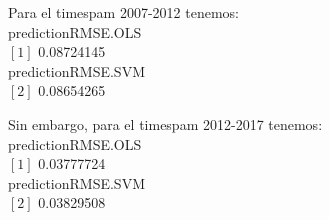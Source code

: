 			\vspace{4mm}	
			
			Para el timespam 2007-2012 tenemos:\\
			predictionRMSE.OLS \\
			
			$[1]$ 0.08724145\\
			predictionRMSE.SVM \\
			$[2]$ 0.08654265\\
			
			\vspace{4mm}	
			
			Sin embargo, para el timespam 2012-2017 tenemos:\\
			
			predictionRMSE.OLS \\
			$[1]$ 0.03777724\\
			predictionRMSE.SVM \\
			$[2]$ 0.03829508\\
			
	

	
